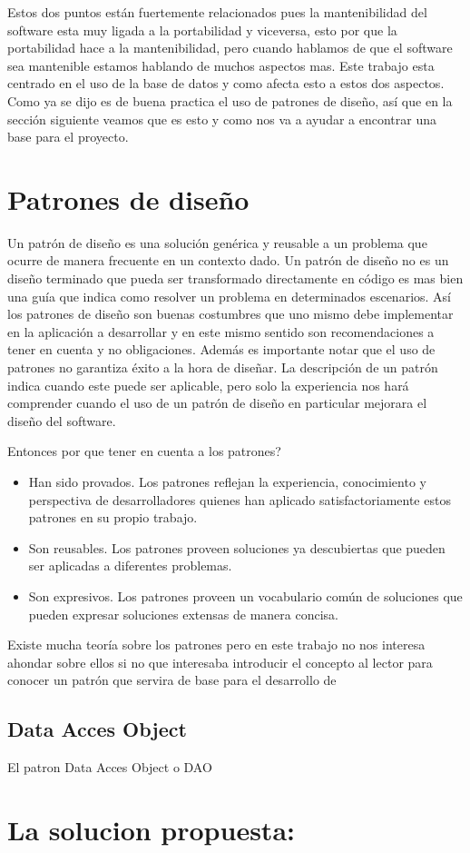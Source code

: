 Estos dos puntos están fuertemente relacionados pues la mantenibilidad del software esta muy ligada a la portabilidad y viceversa, esto por que la portabilidad hace a la mantenibilidad, pero cuando hablamos de que el software sea mantenible estamos hablando de muchos aspectos mas. Este trabajo esta centrado en el uso de la base de datos y como afecta esto a estos dos aspectos. Como ya se dijo es de buena practica el uso de patrones de diseño, así que en la sección siguiente veamos que es esto y como nos va a ayudar a encontrar una base para el proyecto. 
\section{Patrones de diseño}
Un patrón de diseño es una solución genérica y reusable  a un problema que ocurre de manera frecuente en un contexto dado. Un patrón de diseño no es un diseño terminado que pueda ser transformado directamente en código es mas bien una guía que indica como resolver un problema en determinados escenarios. Así los patrones de diseño son buenas costumbres que uno mismo debe implementar en la aplicación a desarrollar y en este mismo sentido son recomendaciones a tener en cuenta y no obligaciones\cite{Metsker:2002:DPJ}. Además es importante notar que el uso de patrones no garantiza éxito a la hora de diseñar. La descripción de un patrón indica cuando este puede ser aplicable, pero solo la experiencia nos hará comprender cuando el uso de un patrón de diseño en particular mejorara el diseño del software\cite{java:patrones}.


Entonces por que tener en cuenta a los patrones?
\begin{itemize}
\item Han sido provados. Los patrones reflejan la experiencia, conocimiento y perspectiva de desarrolladores quienes han aplicado satisfactoriamente estos patrones en su propio trabajo.

\item Son reusables. Los patrones proveen soluciones ya descubiertas que pueden ser aplicadas a diferentes problemas.

\item Son expresivos. Los patrones proveen un vocabulario común de soluciones que pueden expresar soluciones extensas de manera concisa.
\end{itemize}
Existe mucha teoría sobre los patrones pero en este trabajo no nos interesa ahondar sobre ellos si no que interesaba introducir el concepto al lector para conocer un patrón que servira de base para el desarrollo de \jj
\subsection{Data Acces Object}
El patron Data Acces Object o DAO
\section{La solucion propuesta: \jj}